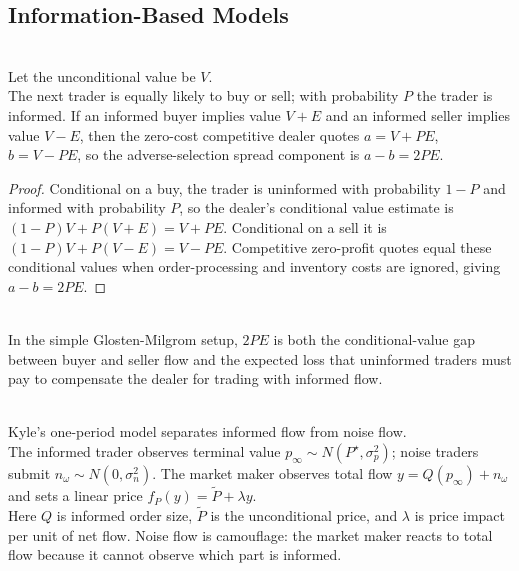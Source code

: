 \subsection{Information-Based Models}

\begin{proposition} \\
Let the unconditional value be $V$.\\
The next trader is equally likely to buy or sell; with probability $P$ the trader is informed. If an informed buyer implies value $V+E$ and an informed seller implies value $V-E$, then the zero-cost competitive dealer quotes $a=V+PE$, $b=V-PE$, so the adverse-selection spread component is $a-b=2PE$.
\begin{proof}
Conditional on a buy, the trader is uninformed with probability $1-P$ and informed with probability $P$, so the dealer's conditional value estimate is $(1-P)V+P(V+E)=V+PE$. Conditional on a sell it is $(1-P)V+P(V-E)=V-PE$. Competitive zero-profit quotes equal these conditional values when order-processing and inventory costs are ignored, giving $a-b=2PE$.
\end{proof}
\end{proposition}

\begin{principle} \\
In the simple Glosten-Milgrom setup, $2PE$ is both the conditional-value gap between buyer and seller flow and the expected loss that uninformed traders must pay to compensate the dealer for trading with informed flow.
\end{principle}

\begin{model} \\
Kyle's one-period model separates informed flow from noise flow.\\
The informed trader observes terminal value $p_\infty\sim N(P^\star,\sigma_p^2)$; noise traders submit $n_\omega\sim N(0,\sigma_n^2)$. The market maker observes total flow $y=Q(p_\infty)+n_\omega$ and sets a linear price $f_P(y)=\tilde{P}+\lambda y$.\\
Here $Q$ is informed order size, $\tilde{P}$ is the unconditional price, and $\lambda$ is price impact per unit of net flow. Noise flow is camouflage: the market maker reacts to total flow because it cannot observe which part is informed.
\end{model}

